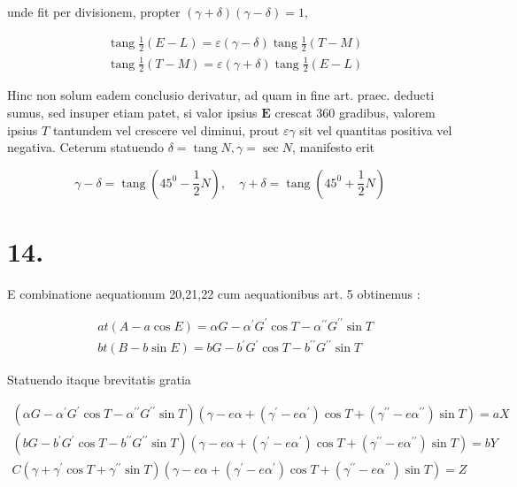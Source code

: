 \documentclass[10pt]{article}
\begin{document}
unde fit per divisionem, propter \((\gamma+\delta)(\gamma-\delta)=1\),

\[
\begin{aligned}
& \operatorname{tang} \frac{1}{2}(E-L)=\varepsilon(\gamma-\delta) \operatorname{tang} \frac{1}{2}(T-M) \\
& \operatorname{tang} \frac{1}{2}(T-M)=\varepsilon(\gamma+\delta) \operatorname{tang} \frac{1}{2}(E-L)
\end{aligned}
\]

Hinc non solum eadem conclusio derivatur, ad quam in fine art. praec. deducti sumus, sed insuper etiam patet, si valor ipsius \(\boldsymbol{E}\) crescat 360 gradibus, valorem ipsius \(T\) tantundem vel crescere vel diminui, prout \(\varepsilon \gamma\) sit vel quantitas positiva vel negativa. Ceterum statuendo \(\delta=\operatorname{tang} N, \gamma=\sec N\), manifesto erit

\[
\gamma-\delta=\operatorname{tang}\left(45^{0}-\frac{1}{2} N\right), \quad \gamma+\delta=\operatorname{tang}\left(45^{0}+\frac{1}{2} N\right)
\]

\section*{14.}
E combinatione aequationum 20,21,22 cum aequationibus art. 5 obtinemus :

\[
\begin{aligned}
& a t(A-a \cos E)=\alpha G-\alpha^{\prime} G^{\prime} \cos T-\alpha^{\prime \prime} G^{\prime \prime} \sin T \\
& b t(B-b \sin E)=b G-b^{\prime} G^{\prime} \cos T-b^{\prime \prime} G^{\prime \prime} \sin T
\end{aligned}
\]

Statuendo itaque brevitatis gratia

\[
\begin{gathered}
\left(\alpha G-\alpha^{\prime} G^{\prime} \cos T-\alpha^{\prime \prime} G^{\prime \prime} \sin T\right)\left(\gamma-e \alpha+\left(\gamma^{\prime}-e \alpha^{\prime}\right) \cos T+\left(\gamma^{\prime \prime}-e \alpha^{\prime \prime}\right) \sin T\right)=a X \\
\left(b G-b^{\prime} G^{\prime} \cos T-b^{\prime \prime} G^{\prime \prime} \sin T\right)\left(\gamma-e \alpha+\left(\gamma^{\prime}-e \alpha^{\prime}\right) \cos T+\left(\gamma^{\prime \prime}-e \alpha^{\prime \prime}\right) \sin T\right)=b Y \\
C\left(\gamma+\gamma^{\prime} \cos T+\gamma^{\prime \prime} \sin T\right)\left(\gamma-e \alpha+\left(\gamma^{\prime}-e \alpha^{\prime}\right) \cos T+\left(\gamma^{\prime \prime}-e \alpha^{\prime \prime}\right) \sin T\right)=Z
\end{gathered}
\]
\end{document}
